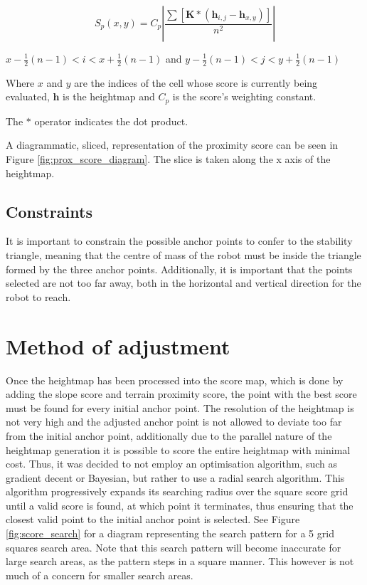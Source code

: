     \begin{equation} \label{eq:terrain_prox}
        S_p(x,y) = C_p\left|\frac{\sum\left[\boldsymbol{K}*(\boldsymbol{h}_{i,j}-\boldsymbol{h}_{x,y})\right]}{n^2}\right|
    \end{equation}

    \begin{center}
        \(x-\frac{1}{2}(n-1)<i<x+\frac{1}{2}(n-1)\) and \(y-\frac{1}{2}(n-1)<j<y+\frac{1}{2}(n-1)\)

        \vspace{0.2cm}
        Where \(x\) and \(y\) are the indices of the cell whose score is currently being evaluated, \(\boldsymbol{h}\) is the
        heightmap and \(C_p\) is the score's weighting constant.

        The \(*\) operator indicates the dot product.
    \end{center}
    
    \noindent
    A diagrammatic, sliced, representation of the proximity score can be seen in Figure \ref{fig:prox_score_diagram}. The
    slice is taken along the x axis of the heightmap.

    \subsection{Constraints}
    It is important to constrain the possible anchor points to confer to the stability triangle,
    meaning that the centre of mass of the robot must be inside the triangle formed by the three
    anchor points. Additionally, it is important that the points selected are not too far away,
    both in the horizontal and vertical direction for the robot to reach.


\section{Method of adjustment}
    Once the heightmap has been processed into the score map, which is done by adding the
    slope score and terrain proximity score, the point with the best score must be found for every
    initial anchor point.
    The resolution of the heightmap is not very high and the adjusted anchor point is not
    allowed to deviate too far from the initial anchor point, additionally due to the parallel nature
    of the heightmap generation it is possible to score the entire heightmap with minimal cost.
    Thus, it was decided to not employ an optimisation algorithm, such as gradient decent or
    Bayesian, but rather to use a radial search algorithm. This algorithm progressively expands
    its searching radius over the square score grid until a valid score is found, at which point it
    terminates, thus ensuring that the closest valid point to the initial anchor point is selected.
    See Figure \ref{fig:score_search} for a diagram representing the search pattern for a 5 grid squares search area.
    Note that this search pattern will become inaccurate for large search areas, as the pattern steps
    in a square manner. This however is not much of a concern for smaller search areas.
